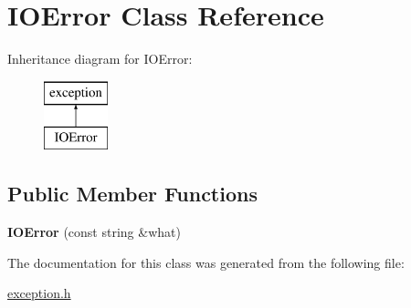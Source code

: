\hypertarget{class_i_o_error}{\section{I\-O\-Error Class Reference}
\label{class_i_o_error}
}
Inheritance diagram for I\-O\-Error\-:\begin{figure}[H]
\begin{center}
\leavevmode
\includegraphics[height=2.000000cm]{class_i_o_error}
\end{center}
\end{figure}
\subsection*{Public Member Functions}
\begin{DoxyCompactItemize}
\item 
\hypertarget{class_i_o_error_aef20e87e03984f98f51706e019a4d141}{{\bfseries I\-O\-Error} (const string \&what)}\label{class_i_o_error_aef20e87e03984f98f51706e019a4d141}

\end{DoxyCompactItemize}


The documentation for this class was generated from the following file\-:\begin{DoxyCompactItemize}
\item 
\hyperlink{exception_8h}{exception.\-h}\end{DoxyCompactItemize}

